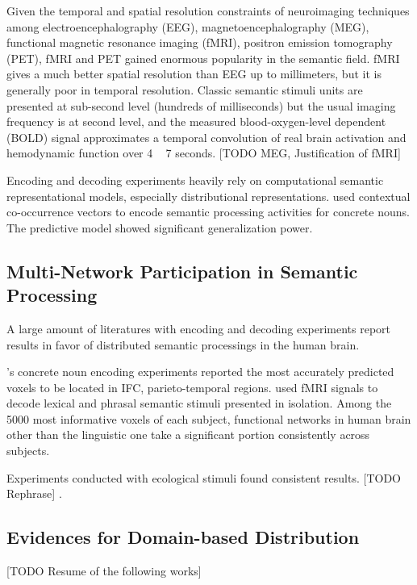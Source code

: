 Given the temporal and spatial resolution constraints of neuroimaging techniques among electroencephalography (EEG), magnetoencephalography (MEG), functional magnetic resonance imaging (fMRI), positron emission tomography (PET), fMRI and PET gained enormous popularity in the semantic field. fMRI gives a much better spatial resolution than EEG up to millimeters, but it is generally poor in temporal resolution. Classic semantic stimuli units are presented at sub-second level (hundreds of milliseconds) but the usual imaging frequency is at second level, and the measured blood-oxygen-level dependent (BOLD) signal approximates a temporal convolution of real brain activation and hemodynamic function over 4 ~ 7 seconds. [TODO MEG, Justification of fMRI]

Encoding and decoding experiments heavily rely on computational semantic representational models, especially distributional representations. \cite{mitchellPredictingHumanBrain2008} used contextual co-occurrence vectors to encode semantic processing activities for concrete nouns. The predictive model showed significant generalization power. 

\subsection{Multi-Network Participation in Semantic Processing}

A large amount of literatures with encoding and decoding experiments report results in favor of distributed semantic processings in the human brain. 

\cite{mitchellPredictingHumanBrain2008}'s concrete noun encoding experiments reported the most accurately predicted voxels to be located in IFC, parieto-temporal regions. \cite{pereiraUniversalDecoderLinguistic2018} used fMRI signals to decode lexical and phrasal semantic stimuli presented in isolation. Among the 5000 most informative voxels of each subject, functional networks in human brain other than the linguistic one take a significant portion consistently across subjects. 

Experiments conducted with ecological stimuli found consistent results. [TODO Rephrase] \parencite{todorovicAnalysesIRMfLors2018, verdierEncodageActiviteNeuronale2018}.

\subsection{Evidences for Domain-based Distribution}
[TODO Resume of the following works]


